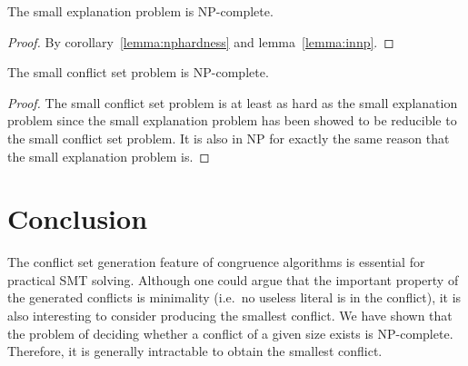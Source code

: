 \documentclass[smallextended]{svjour3}
\begin{document}
\begin{theorem}
The small explanation problem is NP-complete.
\end{theorem}
\begin{proof}
By corollary~\ref{lemma:nphardness} and lemma~\ref{lemma:innp}.
\end{proof}

\begin{theorem}
The small conflict set problem is NP-complete.
\end{theorem}
\begin{proof}
The small conflict set problem is at least as hard as the small explanation problem since the small explanation problem has been showed to be reducible to the small conflict set problem.  It is also in NP for exactly the same reason that the small explanation problem is.
\end{proof}


\section{Conclusion}

The conflict set generation feature of congruence algorithms is essential for
practical SMT solving.  Although one could argue that the important property of the generated conflicts is minimality (i.e.\ no useless literal is in the conflict), it is also interesting to consider producing the smallest conflict.  We have shown that the problem of deciding whether a conflict of a given size exists is NP-complete. Therefore, it is generally intractable to obtain the smallest conflict. 
\end{document}
